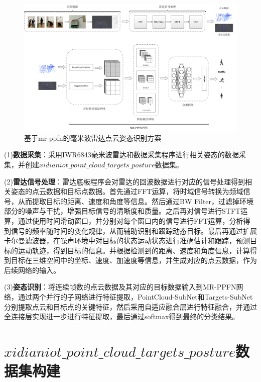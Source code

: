 \begin{figure}[htbp]
    \centering
    \includegraphics[width=0.95\linewidth]{imgs/mr-ppfn structure.pdf}
    \caption{基于mr-ppfn的毫米波雷达点云姿态识别方案}
    \label{fig:mr-ppfn structure strategy}
\end{figure}

(1)\textbf{数据采集}：采用IWR6843毫米波雷达和数据采集程序进行相关姿态的数据采集，并创建$xidianiot\_point\_cloud\_targets\_posture$数据集。

(2)\textbf{雷达信号处理}：雷达底板程序会对雷达的回波数据进行对应的信号处理得到相关姿态的点云数据和目标点数据。首先通过FFT运算，将时域信号转换为频域信号，从而提取目标的距离、速度和角度等信息。然后通过BW Filter，过滤掉环境部分的噪声与干扰，增强目标信号的清晰度和质量。之后再对信号进行STFT运算，通过使用时间滑动窗口，并分别对每个窗口内的信号进行FFT运算，分析得到信号的频率随时间的变化规律，从而辅助识别和跟踪动态目标。最后再通过扩展卡尔曼滤波器，在噪声环境中对目标的状态运动状态进行准确估计和跟踪，预测目标的运动轨迹，得到目标的信息。并根据检测到的距离、速度和角度信息，计算得到目标在三维空间中的坐标、速度、加速度等信息，并生成对应的点云数据，作为后续网络的输入。

(3)\textbf{姿态识别}：将连续帧数的点云数据及其对应的目标数据输入到MR-PPFN网络，通过两个并行的子网络进行特征提取，PointCloud-SubNet和Targets-SubNet分别提取点云和目标点的关键特征，然后采用自适应融合层进行特征融合，并通过全连接层实现进一步进行特征提取，最后通过softmax得到最终的分类结果。                

\section{$xidianiot\_point\_cloud\_targets\_posture$数据集构建}
\label{sec:dataset-build}
